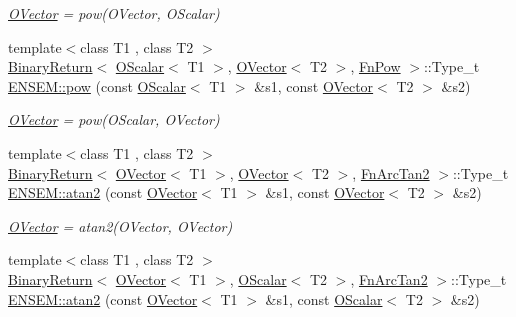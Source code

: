 \begin{DoxyCompactItemize}
\begin{DoxyCompactList}\small\item\em \mbox{\hyperlink{classENSEM_1_1OVector}{O\+Vector}} = pow(\+O\+Vector, O\+Scalar) \end{DoxyCompactList}\item 
{\footnotesize template$<$class T1 , class T2 $>$ }\\\mbox{\hyperlink{structENSEM_1_1BinaryReturn}{Binary\+Return}}$<$ \mbox{\hyperlink{classENSEM_1_1OScalar}{O\+Scalar}}$<$ T1 $>$, \mbox{\hyperlink{classENSEM_1_1OVector}{O\+Vector}}$<$ T2 $>$, \mbox{\hyperlink{structENSEM_1_1FnPow}{Fn\+Pow}} $>$\+::Type\+\_\+t \mbox{\hyperlink{group__obsvector_ga3466dc3452f93c110d8adba91bf1e85a}{E\+N\+S\+E\+M\+::pow}} (const \mbox{\hyperlink{classENSEM_1_1OScalar}{O\+Scalar}}$<$ T1 $>$ \&s1, const \mbox{\hyperlink{classENSEM_1_1OVector}{O\+Vector}}$<$ T2 $>$ \&s2)
\begin{DoxyCompactList}\small\item\em \mbox{\hyperlink{classENSEM_1_1OVector}{O\+Vector}} = pow(\+O\+Scalar, O\+Vector) \end{DoxyCompactList}\item 
{\footnotesize template$<$class T1 , class T2 $>$ }\\\mbox{\hyperlink{structENSEM_1_1BinaryReturn}{Binary\+Return}}$<$ \mbox{\hyperlink{classENSEM_1_1OVector}{O\+Vector}}$<$ T1 $>$, \mbox{\hyperlink{classENSEM_1_1OVector}{O\+Vector}}$<$ T2 $>$, \mbox{\hyperlink{structENSEM_1_1FnArcTan2}{Fn\+Arc\+Tan2}} $>$\+::Type\+\_\+t \mbox{\hyperlink{group__obsvector_gae0d11c0b7d0fc49cc1e2765f21d10a2b}{E\+N\+S\+E\+M\+::atan2}} (const \mbox{\hyperlink{classENSEM_1_1OVector}{O\+Vector}}$<$ T1 $>$ \&s1, const \mbox{\hyperlink{classENSEM_1_1OVector}{O\+Vector}}$<$ T2 $>$ \&s2)
\begin{DoxyCompactList}\small\item\em \mbox{\hyperlink{classENSEM_1_1OVector}{O\+Vector}} = atan2(\+O\+Vector, O\+Vector) \end{DoxyCompactList}\item 
{\footnotesize template$<$class T1 , class T2 $>$ }\\\mbox{\hyperlink{structENSEM_1_1BinaryReturn}{Binary\+Return}}$<$ \mbox{\hyperlink{classENSEM_1_1OVector}{O\+Vector}}$<$ T1 $>$, \mbox{\hyperlink{classENSEM_1_1OScalar}{O\+Scalar}}$<$ T2 $>$, \mbox{\hyperlink{structENSEM_1_1FnArcTan2}{Fn\+Arc\+Tan2}} $>$\+::Type\+\_\+t \mbox{\hyperlink{group__obsvector_ga6f583b255bc8225ce768b9b916c9e271}{E\+N\+S\+E\+M\+::atan2}} (const \mbox{\hyperlink{classENSEM_1_1OVector}{O\+Vector}}$<$ T1 $>$ \&s1, const \mbox{\hyperlink{classENSEM_1_1OScalar}{O\+Scalar}}$<$ T2 $>$ \&s2)

\end{DoxyCompactItemize}
